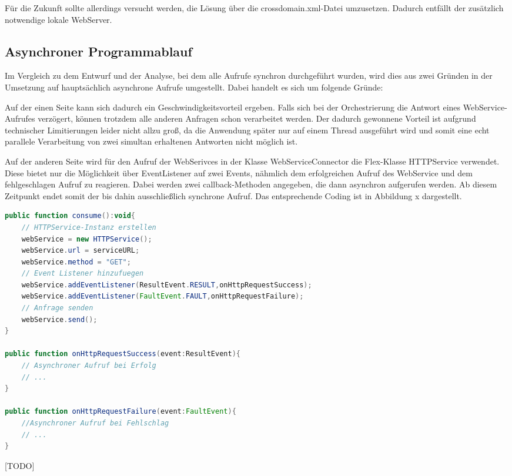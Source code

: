 Für die Zukunft sollte allerdings versucht werden, die Lösung über die crossdomain.xml-Datei umzusetzen. Dadurch entfällt der zusätzlich notwendige lokale WebServer.

\subsection{Asynchroner Programmablauf}
Im Vergleich zu dem Entwurf und der Analyse, bei dem alle Aufrufe synchron durchgeführt wurden, wird dies aus zwei Gründen in der Umsetzung auf hauptsächlich asynchrone Aufrufe umgestellt. Dabei handelt es sich um folgende Gründe:

Auf der einen Seite kann sich dadurch ein Geschwindigkeitsvorteil ergeben. Falls sich bei der Orchestrierung die Antwort eines WebService-Aufrufes verzögert, können trotzdem alle anderen Anfragen schon verarbeitet werden. Der dadurch gewonnene Vorteil ist aufgrund technischer Limitierungen leider nicht allzu groß, da die Anwendung später nur auf einem Thread ausgeführt wird und somit eine echt parallele Verarbeitung von zwei simultan erhaltenen Antworten nicht möglich ist.

Auf der anderen Seite wird für den Aufruf der WebSerivces in der Klasse WebServiceConnector die Flex-Klasse HTTPService verwendet. Diese bietet nur die Möglichkeit über EventListener auf zwei Events, nähmlich dem erfolgreichen Aufruf des WebService und dem fehlgeschlagen Aufruf zu reagieren. Dabei werden zwei callback-Methoden angegeben, die dann asynchron aufgerufen werden. Ab diesem Zeitpunkt endet somit der bis dahin ausschließlich synchrone Aufruf. Das entsprechende Coding ist in Abbildung x dargestellt.

\begin{programm}[h] %
\begin{lstlisting}[language=ActionScript]
public function consume():void{
	// HTTPService-Instanz erstellen
	webService = new HTTPService();
	webService.url = serviceURL;       
	webService.method = "GET";
	// Event Listener hinzufuegen
	webService.addEventListener(ResultEvent.RESULT,onHttpRequestSuccess);
	webService.addEventListener(FaultEvent.FAULT,onHttpRequestFailure);
	// Anfrage senden
	webService.send();
}
		
public function onHttpRequestSuccess(event:ResultEvent){
	// Asynchroner Aufruf bei Erfolg
	// ...
}
		
public function onHttpRequestFailure(event:FaultEvent){
	//Asynchroner Aufruf bei Fehlschlag
	// ...
}
\end{lstlisting}
\caption{[TODO]\label{[TODO]}}
\end{programm}

